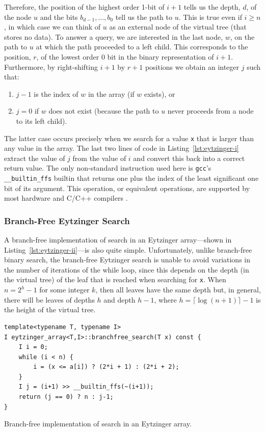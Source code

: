 \documentclass{patmorin}
\newcommand{\lstlabel}[1]{\label{lst:#1}}
\newcommand{\lstref}[1]{Listing~\ref{lst:#1}}
\begin{document}
Therefore, the position of the highest order 1-bit of $i+1$  tells
us the depth, $d$, of the node $u$ and the bits $b_{d-1},\ldots,b_{0}$ tell
us the path to $u$.  This is true even if $i\ge n$, in which case we
can think of $u$ as an external node of the virtual tree (that stores
no data).  To answer a query, we are interested in the last node,
$w$, on the path to $u$ at which the path proceeded to a left child.
This corresponds to the position, $r$, of the lowest order 0 bit in the
binary representation of $i+1$.  Furthermore, by right-shifting $i+1$
by $r+1$ positions we obtain an integer $j$ such that:

\begin{enumerate}
  \item $j-1$ is the index of $w$ in the array (if $w$ exists), or
  \item $j=0$ if $w$ does not exist (because the path to $u$ never proceeds 
        from a node to its left child).
\end{enumerate}

The latter case occurs precisely when we search for a value
\texttt{x} that is larger than any value in the array. The
last two lines of code in \lstref{eytzinger-i} extract the value of $j$
from the value of $i$ and convert this back into a correct return value.
The only non-standard instruction used here is \texttt{gcc}'s
\texttt{__builtin_ffs} builtin that returns one plus the index
of the least significant one bit of its argument.  This operation,
or equivalent operations, are supported by most hardware and C/C++
compilers \cite{wiki:find}.

\subsubsection{Branch-Free Eytzinger Search}

A branch-free implementation of search in an Eytzinger array---shown
in \lstref{eytzinger-ii}---is also quite simple. Unfortunately, unlike
branch-free binary search, the branch-free Eytzinger search is unable
to avoid variations in the number of iterations of the while loop,
since this depends on the depth (in the virtual tree) of the leaf that
is reached when searching for \texttt{x}.  When $n=2^h-1$ for
some integer $k$, then all leaves have the same depth but, in general,
there will be leaves of depths $h$ and depth $h-1$, where $h=\lceil\log
(n+1)\rceil-1$ is the height of the virtual tree.

\begin{listing}
\begin{verbatim}
template<typename T, typename I>
I eytzinger_array<T,I>::branchfree_search(T x) const {
    I i = 0;
    while (i < n) {
        i = (x <= a[i]) ? (2*i + 1) : (2*i + 2);
    }
    I j = (i+1) >> __builtin_ffs(~(i+1));
    return (j == 0) ? n : j-1;
}
\end{verbatim}
\caption{Branch-free implementation of search in an Eytzinger array.}
\lstlabel{eytzinger-ii}
\end{listing}
\end{document}
